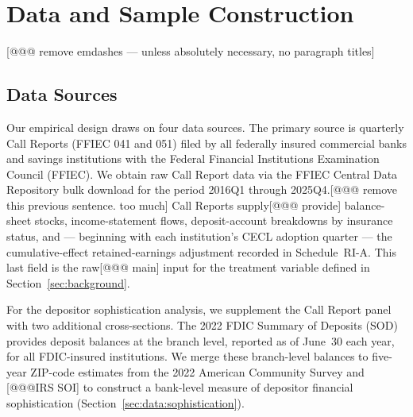 
\section{Data and Sample Construction}
[@@@ remove emdashes --- unless absolutely necessary, no paragraph titles]
\label{sec:data}

\subsection{Data Sources}
\label{sec:data:sources}

Our empirical design draws on four data sources. The primary source is quarterly
Call Reports (FFIEC 041 and 051) filed by all federally insured commercial banks
and savings institutions with the Federal Financial Institutions Examination
Council (FFIEC). We obtain raw Call Report data via the FFIEC Central Data Repository
bulk download for the period 2016Q1 through 2025Q4.[@@@ remove this previous sentence. too much] Call Reports supply[@@@ provide]
balance-sheet stocks, income-statement flows, deposit-account breakdowns by insurance status, and ---
beginning with each institution's CECL adoption quarter --- the cumulative-effect
retained-earnings adjustment recorded in Schedule~RI-A. This last field is the
raw[@@@ main] input for the treatment variable defined in Section~\ref{sec:background}.

For the depositor sophistication analysis, we supplement the Call Report panel
with two additional cross-sections. The 2022 FDIC Summary of Deposits (SOD)
provides deposit balances at the branch level, reported as of June~30 each year,
for all FDIC-insured institutions. We merge these branch-level balances to
five-year ZIP-code estimates from the 2022 American Community Survey
and [@@@IRS SOI] to construct a bank-level measure of depositor financial
sophistication (Section~\ref{sec:data:sophistication}).

